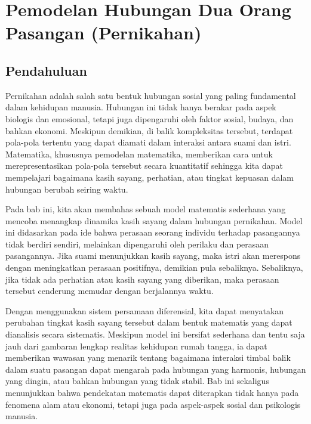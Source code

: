 \documentclass{bukumjh}
\begin{document}

\chapter{Pemodelan Hubungan Dua Orang Pasangan (Pernikahan)}

\section{Pendahuluan}

Pernikahan adalah salah satu bentuk hubungan sosial yang paling fundamental dalam kehidupan manusia. 
Hubungan ini tidak hanya berakar pada aspek biologis dan emosional, tetapi juga dipengaruhi oleh faktor sosial, budaya, dan bahkan ekonomi. 
Meskipun demikian, di balik kompleksitas tersebut, terdapat pola-pola tertentu yang dapat diamati dalam interaksi antara suami dan istri. 
Matematika, khususnya pemodelan matematika, memberikan cara untuk merepresentasikan pola-pola tersebut secara kuantitatif sehingga kita dapat mempelajari bagaimana kasih sayang, perhatian, atau tingkat kepuasan dalam hubungan berubah seiring waktu.

Pada bab ini, kita akan membahas sebuah model matematis sederhana yang mencoba menangkap dinamika kasih sayang dalam hubungan pernikahan. 
Model ini didasarkan pada ide bahwa perasaan seorang individu terhadap pasangannya tidak berdiri sendiri, melainkan dipengaruhi oleh perilaku dan perasaan pasangannya. 
Jika suami menunjukkan kasih sayang, maka istri akan merespons dengan meningkatkan perasaan positifnya, demikian pula sebaliknya. 
Sebaliknya, jika tidak ada perhatian atau kasih sayang yang diberikan, maka perasaan tersebut cenderung memudar dengan berjalannya waktu. 

Dengan menggunakan sistem persamaan diferensial, kita dapat menyatakan perubahan tingkat kasih sayang tersebut dalam bentuk matematis yang dapat dianalisis secara sistematis. 
Meskipun model ini bersifat sederhana dan tentu saja jauh dari gambaran lengkap realitas kehidupan rumah tangga, ia dapat memberikan wawasan yang menarik tentang bagaimana interaksi timbal balik dalam suatu pasangan dapat mengarah pada hubungan yang harmonis, hubungan yang dingin, atau bahkan hubungan yang tidak stabil. 
Bab ini sekaligus menunjukkan bahwa pendekatan matematis dapat diterapkan tidak hanya pada fenomena alam atau ekonomi, tetapi juga pada aspek-aspek sosial dan psikologis manusia.
\end{document}
